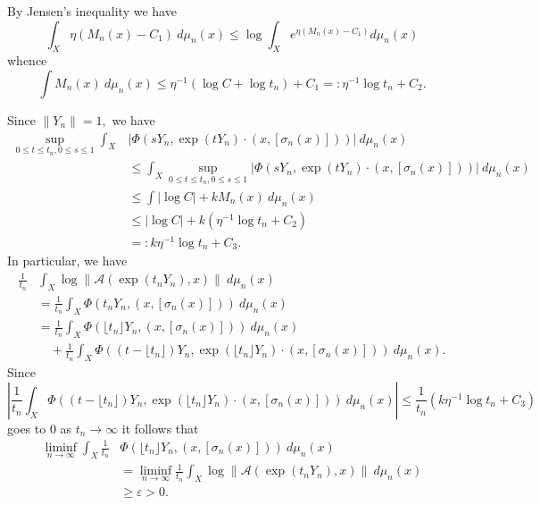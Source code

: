\documentclass[10pt,reqno]{amsart}
\theoremstyle{Theorem}
\theoremstyle{definition}
\theoremstyle{remark}
\newcommand{\note}[1]{\marginpar{{\color{red}\footnotesize \begin{spacing}{1}#1\end{spacing}}}}
\renewcommand{\epsilon}{\varepsilon}
\newcommand{\inv}{^{-1}}
\def\calA{\mathcal A}
\def\calE{\mathcal E}
\renewcommand\P{\mathbb{P}}
\begin{document}
By Jensen's inequality we have
$$\int_X \eta ( M_n(x) - C_1) \ d \mu_n(x) \le \log \int_X e^{\eta (M_n (x)-  C_1)}  d \mu_n (x)$$
whence
 $$\int M_n (x) \ d \mu_n(x) \le \eta\inv( \log  C  + \log t_n )  + C_1 =: \eta\inv \log t_n +  C_2.$$


Since $\|Y_n \| = 1,$ %
we have \begin{equation}\label{eq:autocracy} \begin{aligned}
 \sup _{0\le t\le t_n, 0\le s\le 1}  \int_X &\left| \Phi(sY_n, \exp(t Y_n)\cdot (x, [\sigma_n(x)]))\right |  \ d \mu_n(x)\\
&\le \int_X \sup _{0\le t\le t_n, 0\le s\le 1} \left  | \Phi(sY_n, \exp(t Y_n)\cdot (x, [\sigma_n(x)]))\right |  \ d \mu_n(x)\\
&\le \int |\log C| + k M_n (x) \ d \mu_n(x)\\
&\le |\log C |+ k ( \eta\inv \log t_n +  C_2) \\
&=:   k  \eta\inv \log t_n +  C_3.
\end{aligned}\end{equation}
In particular, we have
 \begin{align*}\frac{1}{t_n} & \int_X \log \|\calA(\exp(t_nY_n), x) \| \ d \mu_n(x) \\
 & = \frac{1}{t_n}\int_X \Phi(t_nY_n, (x,[\sigma_n(x)])) \ d \mu_n(x) \\
 & = \frac{1}{t_n}\int_X\Phi(\lfloor t_n\rfloor Y_n, (x,[\sigma_n(x)]))\ d \mu_n(x)  \\ &\quad  +
 \frac{1}{t_n}\int_X \Phi((t-\lfloor t_n\rfloor) Y_n, \exp (\lfloor t_n\rfloor Y_n)\cdot (x,[\sigma_n(x)]))\ d \mu_n(x) .
 \end{align*}
 Since
 $$\left|\frac{1}{t_n} \int_X \Phi((t-\lfloor t_n\rfloor) Y_n, \exp (\lfloor t_n\rfloor Y_n)\cdot (x,[\sigma_n(x)]))\ d \mu_n(x) \right|\le \frac{1}{t_n}( k  \eta\inv \log t_n +  C_3)$$ goes to 0 as $t_n\to \infty$
 it follows that
 \begin{equation}
 \begin{aligned}\label{eq:thiseq}\liminf_{n\to \infty} \int_X  \frac{1}{t_n}&\Phi(\lfloor t_n\rfloor Y_n, (x,[\sigma_n(x)]))  \ d \mu_n(x)  \\&= \liminf_{n\to \infty} \frac{1}{t_n} \int_X  \log \|\calA(\exp(t_nY_n), x) \| \ d \mu_n(x)\\& \ge \epsilon >0.
 \end{aligned}\end{equation}
\end{document}
